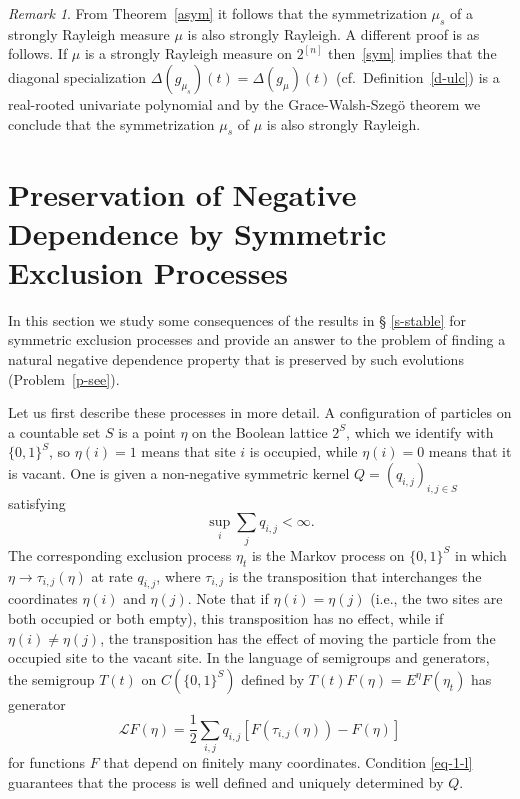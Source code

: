 \documentclass[10pt,reqno]{amsart}
\theoremstyle{plain}
\theoremstyle{definition}
\theoremstyle{remark}
\newtheorem{remark}{Remark}[section]
\newcommand{\De}{\Delta}
\begin{document}
\begin{remark}\label{rem-sym}
From Theorem~\ref{asym} it follows that the symmetrization $\mu_s$ of a 
strongly Rayleigh measure $\mu$ is also strongly Rayleigh. A different 
proof is as follows. If $\mu$ is a strongly Rayleigh measure on $2^{[n]}$ 
then~\eqref{sym} implies that the diagonal
specialization $\De(g_{\mu_s})(t)=\De(g_{\mu})(t)$ (cf.~Definition~\ref{d-ulc})
is a real-rooted univariate polynomial and by the 
Grace-Walsh-Szeg\"o theorem we conclude that the symmetrization
$\mu_s$ of $\mu$ is also strongly Rayleigh.
\end{remark}

\section{Preservation of Negative Dependence by Symmetric Exclusion 
Processes}\label{n-s6}

In this section we study some consequences of the results in \S 
\ref{s-stable} for symmetric exclusion processes and provide an answer to
the problem of finding a natural negative dependence 
property that is preserved by such evolutions (Problem~\ref{p-see}).

Let us first describe these processes in more detail. A configuration of 
particles on a countable set $S$ is a point
$\eta$ on the Boolean lattice $2^S$, which we identify with $\{0,1\}^S$, so 
$\eta(i)=1$ means that site $i$ is occupied, while $\eta(i)=0$ means that it 
is vacant. One is given a non-negative symmetric kernel 
$Q=(q_{i,j})_{i,j\in S}$ satisfying
\begin{equation}\label{eq-1-l}
\sup_i\sum_jq_{i,j}<\infty.
\end{equation}
The corresponding exclusion process $\eta_t$ is the Markov process on 
$\{0,1\}^{S}$ in which
$\eta\rightarrow \tau_{i,j}(\eta)$ at rate $q_{i,j}$, where $\tau_{i,j}$ 
is the transposition
that interchanges the coordinates $\eta(i)$ and $\eta(j)$. Note that if
$\eta(i)=\eta(j)$ (i.e., the two sites are both occupied or both empty), 
this transposition has no effect,
while if $\eta(i)\neq\eta(j)$, the transposition has the effect of moving the
particle from
the occupied site to the vacant site. In the language of semigroups and 
generators, the
semigroup $T(t)$ on $C(\{0,1\}^S)$ defined by 
$T(t)F(\eta)=E^{\eta}F(\eta_t)$ has generator
$$\mathcal{L}F(\eta)=\frac 12\sum_{i,j}q_{i,j}[F(\tau_{i,j}(\eta))-F(\eta)]$$
for functions $F$ that depend on finitely many coordinates. Condition 
\eqref{eq-1-l} guarantees
that the process is well defined and uniquely determined by $Q$.
\end{document}
